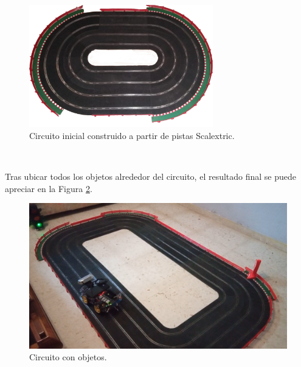 \begin{figure} [h!]
	\begin{center}
		\includegraphics[width=8cm]{figs/circuit}
	\end{center}
	\caption{Circuito inicial construido a partir de pistas Scalextric.}
	\label{fig:circuit}
\end{figure}\

Tras ubicar todos los objetos alrededor del circuito, el resultado final se puede apreciar en la Figura \ref{fig:circuitwithobjects2}.\\

\begin{figure} [h!]
	\begin{center}
		\includegraphics[width=12cm]{figs/circuitwithobjects2}
	\end{center}
	\caption{Circuito con objetos.}
	\label{fig:circuitwithobjects2}
\end{figure}\

